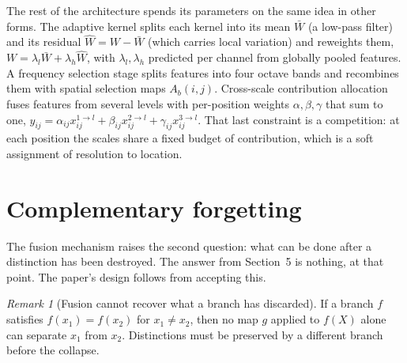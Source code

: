 \documentclass[11pt]{article}
\theoremstyle{definition}
\theoremstyle{remark}
\newtheorem{remark}{Remark}
\begin{document}
The rest of the architecture spends its parameters on the same idea in other forms. The adaptive kernel splits each kernel into its mean $\bar W$ (a low-pass filter) and its residual $\hat W=W-\bar W$ (which carries local variation) and reweights them, $W=\lambda_l\bar W+\lambda_h\hat W$, with $\lambda_l,\lambda_h$ predicted per channel from globally pooled features. A frequency selection stage splits features into four octave bands and recombines them with spatial selection maps $A_b(i,j)$. Cross-scale contribution allocation fuses features from several levels with per-position weights $\alpha,\beta,\gamma$ that sum to one, $y_{ij}=\alpha_{ij}x^{1\to l}_{ij}+\beta_{ij}x^{2\to l}_{ij}+\gamma_{ij}x^{3\to l}_{ij}$. That last constraint is a competition: at each position the scales share a fixed budget of contribution, which is a soft assignment of resolution to location.

\section{Complementary forgetting}

The fusion mechanism raises the second question: what can be done after a distinction has been destroyed. The answer from Section~5 is nothing, at that point. The paper's design follows from accepting this.

\begin{remark}[Fusion cannot recover what a branch has discarded]
If a branch $f$ satisfies $f(x_1)=f(x_2)$ for $x_1\neq x_2$, then no map $g$ applied to $f(X)$ alone can separate $x_1$ from $x_2$. Distinctions must be preserved by a different branch before the collapse.
\end{remark}
\end{document}

